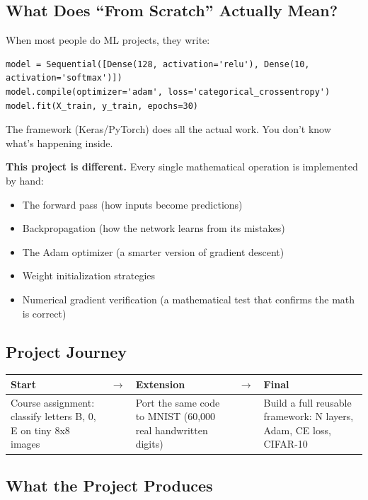 \documentclass[12pt, a4paper]{article}
\begin{document}
\subsection{What Does ``From Scratch'' Actually Mean?}

When most people do ML projects, they write:
\begin{lstlisting}
model = Sequential([Dense(128, activation='relu'), Dense(10, activation='softmax')])
model.compile(optimizer='adam', loss='categorical_crossentropy')
model.fit(X_train, y_train, epochs=30)
\end{lstlisting}

The framework (Keras/PyTorch) does all the actual work. You don't know what's happening inside.

\textbf{This project is different.} Every single mathematical operation is implemented by hand:
\begin{itemize}
  \item The forward pass (how inputs become predictions)
  \item Backpropagation (how the network learns from its mistakes)
  \item The Adam optimizer (a smarter version of gradient descent)
  \item Weight initialization strategies
  \item Numerical gradient verification (a mathematical test that confirms the math is correct)
\end{itemize}

\subsection{Project Journey}

\begin{center}
\begin{tabular}{p{} c p{} c p{}}
  \toprule
  \textbf{Start} & $\rightarrow$ & \textbf{Extension} & $\rightarrow$ & \textbf{Final} \\
  \midrule
  Course assignment: classify letters B, 0, E on tiny 8x8 images & &
  Port the same code to MNIST (60,000 real handwritten digits) & &
  Build a full reusable framework: N layers, Adam, CE loss, CIFAR-10 \\
  \bottomrule
\end{tabular}
\end{center}

\subsection{What the Project Produces}
\end{document}
